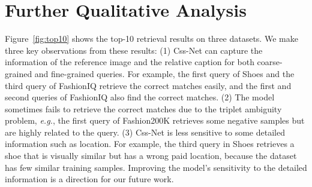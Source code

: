 \documentclass[sigconf]{acmart}
\def\eg{\emph{e.g.}}
\begin{document}
\section{Further Qualitative Analysis}
\label{subsec:qualitative}
Figure~\ref{fig:top10} shows the top-10 retrieval results on three datasets. We make three key observations from these results: (1) Css-Net can capture the information of the reference image and the relative caption for both coarse-grained and fine-grained queries. For example, the first query of Shoes and the third query of FashionIQ retrieve the correct matches easily, and the first and second queries of FashionIQ also find the correct matches. (2) The model sometimes fails to retrieve the correct matches due to the triplet ambiguity problem, \eg, the first query of Fashion200K retrieves some negative samples but are highly related to the query. (3) Css-Net is less sensitive to some detailed information such as location. For example, the third query in Shoes retrieves a shoe that is visually similar but has a wrong paid location, because the dataset has few similar training samples. Improving the model’s sensitivity to the detailed information is a direction for our future work. \clearpage
\end{document}
